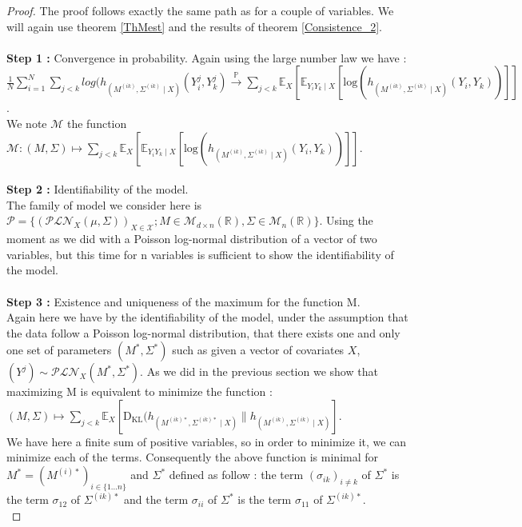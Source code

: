 \documentclass[11pt, a4paper]{article}
\begin{document}
\begin{proof}
The proof follows exactly the same path as for a couple of variables. We will again use theorem \ref{ThMest} and the results of theorem \ref{Consistence_2}.\\
\\
\textbf{Step 1 :} Convergence in probability.
Again using the large number law we have :\\
 $\frac{1}{N}\sum_{i=1}^{N} \sum_{j<k} log(h_{(M^{(ik)},\Sigma^{(ik)} \mid X)} (Y^j_i,Y^j_k) \overset{\mathbb{P}}{\longrightarrow} \sum_{j<k}\mathbb{E}_X [\mathbb{E}_{Y_i Y_k \mid X}[\mathrm{log}(h_{(M^{(ik)},\Sigma^{(ik)} \mid X)}(Y_i,Y_k))]]$.\\
 We note $\mathcal{M}$ the function $\mathcal{M} : (M, \Sigma) \mapsto \sum_{j<k}\mathbb{E}_X [\mathbb{E}_{Y_i Y_k \mid X}[\mathrm{log}(h_{(M^{(ik)},\Sigma^{(ik)} \mid X)}(Y_i,Y_k))]]$.\\
 \\
 \textbf{Step 2 :} Identifiability of the model.\\
The family of model we consider here is $\mathcal{P}=\{ (\mathcal{PLN}_X(\mu,\Sigma))_{X \in \mathcal{X}}; M \in \mathcal{M}_{d \times n}(\mathbb{R}), \Sigma \in \mathcal{M}_n(\mathbb{R})\}$. Using the moment as we did with a Poisson log-normal distribution of a vector of two variables, but this time for n variables is sufficient to show the identifiability of the model.\\
\\
\textbf{Step 3 :} Existence and uniqueness of the maximum for the function M.\\
Again here we have by the identifiability of the model, under the assumption that the data follow a Poisson log-normal distribution, that there exists one and only one set of parameters $(M^\ast, \Sigma^\ast)$ such as given a vector of covariates $X$, $(Y^j) \sim \mathcal{PLN}_X (M^\ast, \Sigma^\ast)$. As we did in the previous section we show that maximizing M is equivalent to minimize the function :\\
$(M, \Sigma) \mapsto \sum_{j<k} \mathbb{E}_X [\mathrm{D_{KL}}(h_{(M^{(ik)\ast},\Sigma^{(ik)\ast} \mid X)} \parallel h_{(M^{(ik)},\Sigma^{(ik)} \mid X)}]$.\\
We have here a finite sum of positive variables, so in order to minimize it, we can minimize each of the terms. Consequently the above function is minimal for $M^\ast=(M^{(i)\ast})_{i \in \{1...n\}}$ and $\Sigma^\ast$ defined as follow : the term $(\sigma_{ik})_{i \neq k}$ of $\Sigma^\ast$ is the term $\sigma_{12}$ of $\Sigma^{(ik)\ast}$  and the term $\sigma_{ii}$ of $\Sigma^\ast$ is the term $\sigma_{11}$ of $\Sigma^{(ik)\ast}$.\\

\end{proof}
\end{document}
